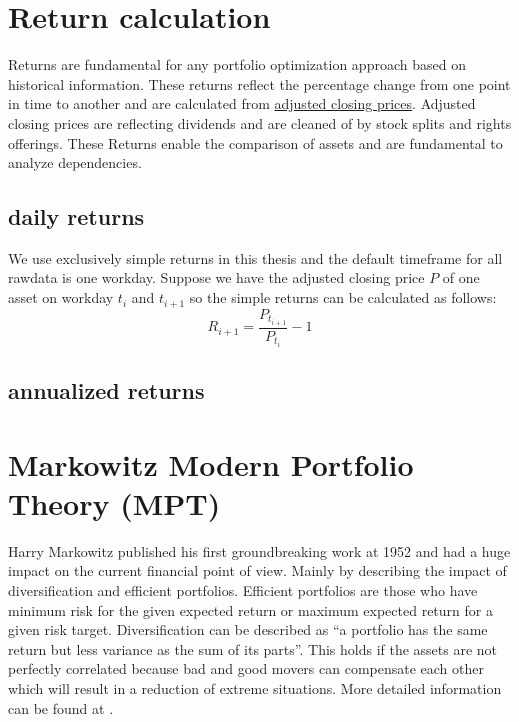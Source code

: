 \documentclass[
  oneside]{book}
\begin{document}
\hypertarget{return-calculation}{%
\section{Return calculation}\label{return-calculation}}

Returns are fundamental for any portfolio optimization approach based on historical information. These returns reflect the percentage change from one point in time to another and are calculated from \href{https://www.investopedia.com/terms/a/adjusted_closing_price.asp}{adjusted closing prices}. Adjusted closing prices are reflecting dividends and are cleaned of by stock splits and rights offerings. These Returns enable the comparison of assets and are fundamental to analyze dependencies.

\hypertarget{daily-returns}{%
\subsection{daily returns}\label{daily-returns}}

We use exclusively simple returns in this thesis and the default timeframe for all rawdata is one workday. Suppose we have the adjusted closing price \(P\) of one asset on workday \(t_i\) and \(t_{i+1}\) so the simple returns can be calculated as follows:
\[
  R_{i+1} = \frac{P_{t_{i+1}}}{P_{t_i}}-1
\]

\hypertarget{annualized-returns}{%
\subsection{annualized returns}\label{annualized-returns}}

\hypertarget{markowitz-modern-portfolio-theory-mpt}{%
\section{Markowitz Modern Portfolio Theory (MPT)}\label{markowitz-modern-portfolio-theory-mpt}}

Harry Markowitz published his first groundbreaking work at 1952 and had a huge impact on the current financial point of view. Mainly by describing the impact of diversification and efficient portfolios. Efficient portfolios are those who have minimum risk for the given expected return or maximum expected return for a given risk target. Diversification can be described as ``a portfolio has the same return but less variance as the sum of its parts''. This holds if the assets are not perfectly correlated because bad and good movers can compensate each other which will result in a reduction of extreme situations. More detailed information can be found at \citep{Mari2005}.
\end{document}
